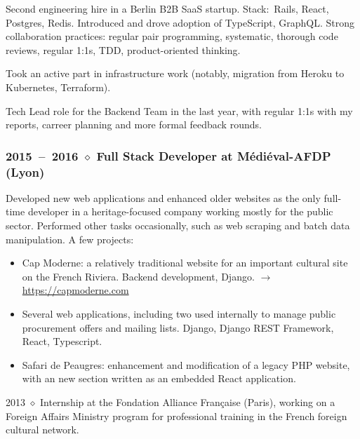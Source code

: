 \documentclass[10pt]{article}
\begin{document}
\begin{minipage}[t]{0.54\textwidth}
    Second engineering hire in a Berlin B2B SaaS startup. Stack:~Rails, React,
    Postgres, Redis. Introduced and drove adoption of
    TypeScript, GraphQL. Strong collaboration practices: regular pair programming, systematic, thorough code reviews, regular 1:1s, TDD, product-oriented thinking.

    Took an active part in infrastructure work (notably, migration from Heroku
    to Kubernetes, Terraform).

    Tech Lead role for the Backend Team in the last year, with regular 1:1s with
    my reports, carreer planning and more formal feedback rounds.

    \vspace{-0.5em}

    \subsubsection*{2015~--~2016 $\diamond$ Full Stack Developer at Médiéval-AFDP (Lyon)}

    \vspace{-0.8em}

    Developed new web applications and enhanced older websites as the only
    full-time developer in a heritage-focused company working mostly for
    the public sector. Performed other tasks occasionally, such as web
    scraping and batch data manipulation. A few projects:
    \begin{itemize}
    \item
      Cap Moderne: a relatively traditional website for an important cultural site
      on the French Riviera. Backend development, Django. $\rightarrow$ \url{https://capmoderne.com}
    \item
      Several web applications, including two used internally to manage public
      procurement offers and mailing lists. Django, Django REST Framework,
      React, Typescript.
    \item
      Safari de Peaugres: enhancement and modification of a legacy PHP website,
      with an new section written as an embedded React application.
    \end{itemize}

  2013 $\diamond$ Internship at the Fondation Alliance Française (Paris), working on a
  Foreign Affairs Ministry program for professional training in the French
  foreign cultural network.
\end{minipage}
\hfill
\end{document}
